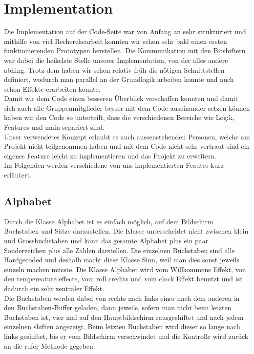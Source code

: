 \documentclass[12pt,a4paper]{article}
\begin{document}
\section{Implementation}

Die Implementation auf der Code-Seite war von Anfang an sehr strukturiert und mithilfe von viel Recherchearbeit konnten wir schon sehr bald einen ersten funktionierenden Prototypen herstellen. Die Kommunikation mit den Bitshiftern war dabei die heikelste Stelle unserer Implementation, von der alles andere abhing. Trotz dem haben wir schon relativ früh die nötigen Schnittstellen definiert, wodurch man parallel an der Grundlogik arbeiten konnte und auch schon Effekte erarbeiten konnte.\\
Damit wir dem Code einen besseren Überblick verschaffen konnten und damit sich auch alle Gruppenmitglieder besser mit dem Code auseinander setzen können haben wir den Code so unterteilt, dass die verschiedenen Bereiche wie Logik, Features und main separiert sind. \\
Unser verwendetes Konzept erlaubt es auch aussenstehenden Personen, welche am Projekt nicht teilgenommen haben und mit dem Code nicht sehr
vertraut sind ein eigenes Feature leicht zu implementieren und das Projekt zu erweitern\cite{readMeCode}. \\
Im Folgenden werden verschiedene von uns implementierten Feautes kurz erläutert.
\newpage
\subsection{Alphabet}

Durch die Klasse Alphabet ist es einfach möglich, auf dem Bildschirm Buchstaben und Sätze darzustellen. Die Klasse unterscheidet nicht zwischen klein und Grossbuchstaben und kann das gesamte Alphabet plus ein paar Sonderzeichen plus alle Zahlen darstellen. Die einzelnen Buchstaben sind alle Hardgecoded und deshalb macht diese Klasse Sinn, weil man dies sonst jeweils einzeln machen müsste. Die Klasse Alphabet wird vom Willkommens Effekt, von den tempereature effects, vom roll credits und vom clock Effekt benutzt und ist dadurch ein sehr zentraler Effekt. \\

Die Buchstaben werden dabei von rechts nach links einer nach dem anderen in den Buchstaben-Buffer geladen, dann jeweils, sofern man nicht beim letzten Buchstaben ist, vier mal auf den Hauptbildschirm rausgeshiftet und nach jedem einzelnen shiften angezeigt. Beim letzten Buchstaben wird dieser so lange nach links geshiftet, bis er vom Bildschirm verschwindet und die Kontrolle wird zurück an die rufer Methode gegeben.
\end{document}
